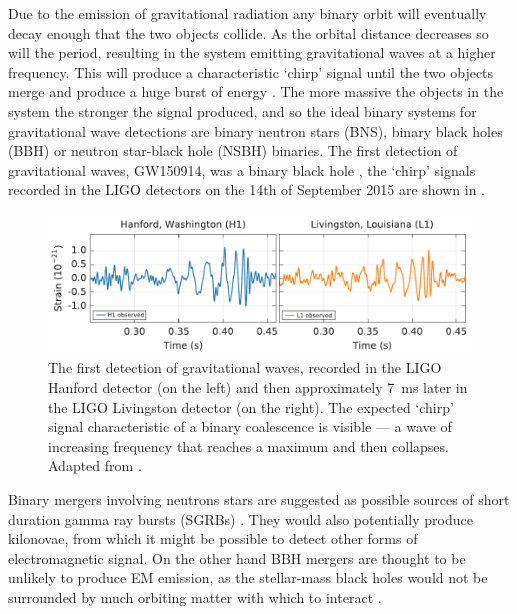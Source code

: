 \begin{colsection}
\begin{colsection}
Due to the emission of gravitational radiation any binary orbit will eventually decay enough that the two objects collide. As the orbital distance decreases so will the period, resulting in the system emitting gravitational waves at a higher frequency. This will produce a characteristic `chirp' signal until the two objects merge and produce a huge burst of energy \citep{GW_sources, BIGparis}. The more massive the objects in the system the stronger the signal produced, and so the ideal binary systems for gravitational wave detections are binary neutron stars (BNS), binary black holes (BBH) or neutron star-black hole (NSBH) binaries. The first detection of gravitational waves, GW150914, was a binary black hole \citep{GW150914}, the `chirp' signals recorded in the LIGO detectors on the 14th of September 2015 are shown in .

\begin{figure}[t]
    \begin{center}
        \includegraphics[width=\linewidth]{images/chirp.pdf}
    \end{center}
    \caption[The first detection of gravitational waves]{
        The first detection of gravitational waves, recorded in the LIGO Hanford detector (on the left) and then approximately \SI{7}{\milli\second} later in the LIGO Livingston detector (on the right). The expected `chirp' signal characteristic of a binary coalescence is visible --- a wave of increasing frequency that reaches a maximum and then collapses. Adapted from \citet{GW150914}.
        }\label{fig:chirp}
\end{figure}


Binary mergers involving neutrons stars are suggested as possible sources of short duration gamma ray bursts (SGRBs) \citep{GW-NSbinaries}. They would also potentially produce kilonovae, from which it might be possible to detect other forms of electromagnetic signal. On the other hand BBH mergers are thought to be unlikely to produce EM emission, as the stellar-mass black holes would not be surrounded by much orbiting matter with which to interact \citep{GW-BHbinaries,GW150914followup}.


\end{colsection}
\end{colsection}
